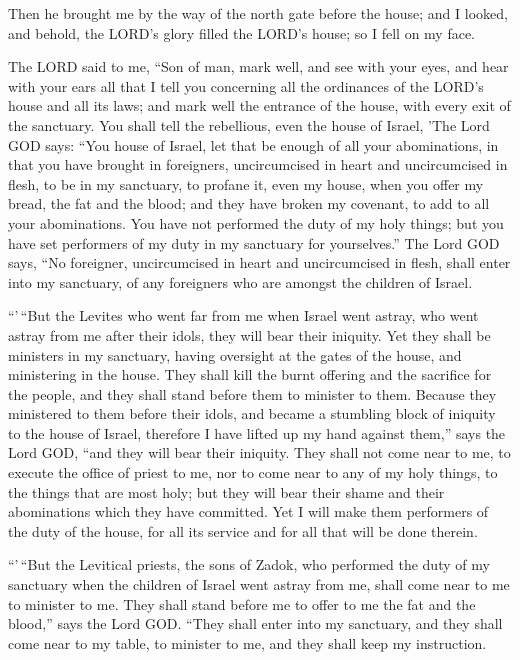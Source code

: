  Then he brought me by the way of the north gate before the
house; and I looked, and behold, the LORD's glory filled the LORD's
house; so I fell on my face.

 The LORD said to me, ``Son of man, mark well, and see with
your eyes, and hear with your ears all that I tell you concerning all
the ordinances of the LORD's house and all its laws; and mark well the
entrance of the house, with every exit of the sanctuary. 
You shall tell the rebellious, even the house of Israel, 'The Lord GOD
says: ``You house of Israel, let that be enough of all your
abominations,  in that you have brought in foreigners,
uncircumcised in heart and uncircumcised in flesh, to be in my
sanctuary, to profane it, even my house, when you offer my bread, the
fat and the blood; and they have broken my covenant, to add to all your
abominations.  You have not performed the duty of my holy
things; but you have set performers of my duty in my sanctuary for
yourselves.''  The Lord GOD says, ``No foreigner,
uncircumcised in heart and uncircumcised in flesh, shall enter into my
sanctuary, of any foreigners who are amongst the children of Israel.

 ``'\,``But the Levites who went far from me when Israel
went astray, who went astray from me after their idols, they will bear
their iniquity.  Yet they shall be ministers in my
sanctuary, having oversight at the gates of the house, and ministering
in the house. They shall kill the burnt offering and the sacrifice for
the people, and they shall stand before them to minister to them.
 Because they ministered to them before their idols, and
became a stumbling block of iniquity to the house of Israel, therefore I
have lifted up my hand against them,'' says the Lord GOD, ``and they
will bear their iniquity.  They shall not come near to me,
to execute the office of priest to me, nor to come near to any of my
holy things, to the things that are most holy; but they will bear their
shame and their abominations which they have committed. 
Yet I will make them performers of the duty of the house, for all its
service and for all that will be done therein.

 ``'\,``But the Levitical priests, the sons of Zadok, who
performed the duty of my sanctuary when the children of Israel went
astray from me, shall come near to me to minister to me. They shall
stand before me to offer to me the fat and the blood,'' says the Lord
GOD.  ``They shall enter into my sanctuary, and they shall
come near to my table, to minister to me, and they shall keep my
instruction.

